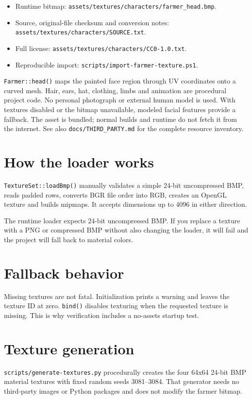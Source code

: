 \documentclass[11pt,a4paper,openany]{book}
\newcommand{\code}[1]{\texttt{#1}}
\newcommand{\file}[1]{\nolinkurl{#1}}
\begin{document}
\begin{itemize}
	\item Runtime bitmap: \file{assets/textures/characters/farmer_head.bmp}.
	\item Source, original-file checksum and conversion notes: \file{assets/textures/characters/SOURCE.txt}.
	\item Full license: \file{assets/textures/characters/CC0-1.0.txt}.
	\item Reproducible import: \file{scripts/import-farmer-texture.ps1}.
\end{itemize}

\code{Farmer::head()} maps the painted face region through UV coordinates onto a curved mesh. Hair, ears, hat, clothing, limbs and animation are procedural project code. No personal photograph or external human model is used. With textures disabled or the bitmap unavailable, modeled facial features provide a fallback. The asset is bundled; normal builds and runtime do not fetch it from the internet. See also \file{docs/THIRD_PARTY.md} for the complete resource inventory.

\section{How the loader works}
\code{TextureSet::loadBmp()} manually validates a simple 24-bit uncompressed BMP, reads padded rows, converts BGR file order into RGB, creates an OpenGL texture and builds mipmaps. It accepts dimensions up to 4096 in either direction.

\begin{warningbox}
	The runtime loader expects 24-bit uncompressed BMP. If you replace a texture with a PNG or compressed BMP without also changing the loader, it will fail and the project will fall back to material colors.
\end{warningbox}

\section{Fallback behavior}
Missing textures are not fatal. Initialization prints a warning and leaves the texture ID at zero. \code{bind()} disables texturing when the requested texture is missing. This is why verification includes a no-assets startup test.

\section{Texture generation}
\file{scripts/generate-textures.py} procedurally creates the four 64x64 24-bit BMP material textures with fixed random seeds 3081--3084. That generator needs no third-party images or Python packages and does not modify the farmer bitmap.
\end{document}
